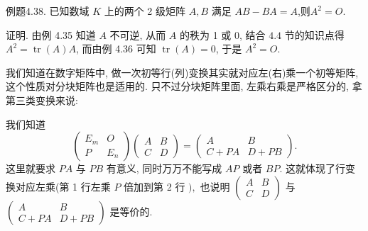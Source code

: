 \documentclass{article}
\begin{document}
\vspace{1ex}
{\heiti 例题4.38.} {\kaishu 已知数域 $K$ 上的两个 2 级矩阵 $A, B$ 满足 $A B - B A = A$,则$A^2 = O$.}

\vspace{1ex}
{\heiti 证明.} 由例 4.35 知道 $A$ 不可逆, 从而 $A$ 的秩为 1 或 0, 结合 $4.4$ 节的知识点得 $A^{2}=\operatorname{tr}(A) A$, 而由例 4.36 可知 $\operatorname{tr}(A)=0$, 于是 $A^{2}=O .$

\vspace{2ex}

\vspace{2ex}
我们知道在数字矩阵中, 做一次初等行(列)变换其实就对应左(右)乘一个初等矩阵, 这个性质对分块矩阵也是适用的. 只不过分块矩阵里面, 左乘右乘是严格区分的, 拿第三类变换来说:

我们知道
\begin{equation*}
    \left(\begin{array}{cc}
        E_{m} & O     \\
        P     & E_{n}
    \end{array}\right)\left(\begin{array}{cc}
        A & B \\
        C & D
    \end{array}\right)=\left(\begin{array}{cc}
        A     & B     \\
        C+P A & D+P B
    \end{array}\right).
\end{equation*}
这里就要求 $P A$ 与 $P B$ 有意义, 同时万万不能写成 $A P$ 或者 $B P .$ 这就体现了行变换对应左乘(第 1 行左乘 $P$ 倍加到第 2 行 $),$ 也说明 $\left(\begin{array}{cc}A & B \\ C & D\end{array}\right)$ 与 $\left(\begin{array}{cc}A & B \\ C+P A & D+P B\end{array}\right)$ 是等价的.
\end{document}
